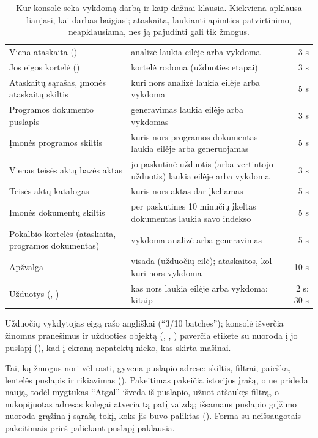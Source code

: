\begin{table}[H]
\caption{Kur konsolė seka vykdomą darbą ir kaip dažnai klausia. Kiekviena apklausa liaujasi, kai
darbas baigiasi; ataskaita, laukianti apimties patvirtinimo, neapklausiama, nes ją pajudinti gali
tik žmogus.}\label{tab:console:polling}
\begin{tabularx}{\textwidth}{@{}L{48mm}Yr@{}}
\toprule
{} &  &  \\
\midrule
Viena ataskaita () & analizė laukia eilėje arba vykdoma & 3 s \\
Jos eigos kortelė () & kortelė rodoma (užduoties etapai) & 3 s \\
Ataskaitų sąrašas, įmonės ataskaitų skiltis & kuri nors analizė laukia eilėje arba vykdoma & 5 s \\
Programos dokumento puslapis & generavimas laukia eilėje arba vykdomas & 3 s \\
Įmonės programos skiltis & kuris nors programos dokumentas laukia eilėje arba generuojamas & 5 s \\
Vienas teisės aktų bazės aktas & jo paskutinė užduotis (arba vertintojo užduotis) laukia eilėje arba vykdoma & 3 s \\
Teisės aktų katalogas & kuris nors aktas dar įkeliamas & 5 s \\
Įmonės dokumentų skiltis & per paskutines 10 minučių įkeltas dokumentas laukia savo indekso & 5 s \\
Pokalbio kortelės (ataskaita, programos dokumentas) & vykdoma analizė arba generavimas & 5 s \\
Apžvalga & visada (užduočių eilė); ataskaitos, kol kuri nors vykdoma & 10 s \\
Užduotys (, ) & kas nors laukia eilėje arba vykdoma; kitaip & 2 s; 30 s \\
\bottomrule
\end{tabularx}
\end{table}

Užduočių vykdytojas eigą rašo angliškai (\enquote{3/10 batches}); konsolė išverčia žinomus
pranešimus ir užduoties objektą (, , )
paverčia etikete su nuoroda į jo puslapį (), kad į ekraną nepatektų
nieko, kas skirta mašinai.

Tai, ką žmogus nori vėl rasti, gyvena puslapio adrese: skiltis, filtrai, paieška, lentelės
puslapis ir rikiavimas (). Pakeitimas pakeičia istorijos įrašą,
o ne prideda naują, todėl mygtukas \enquote{Atgal} išveda iš puslapio, užuot atšaukęs filtrą, o
nukopijuotas adresas kolegai atveria tą patį vaizdą; išsamaus puslapio grįžimo nuoroda grąžina
į sąrašą tokį, koks jis buvo paliktas (). Forma su
neišsaugotais pakeitimais prieš paliekant puslapį paklausia.

